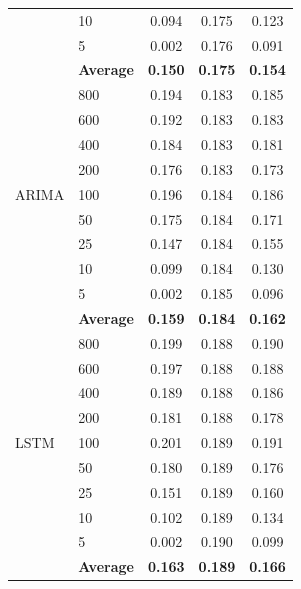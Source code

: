 \documentclass[11pt,a4paper]{article}
\begin{document}
\begin{table}[H]
\begin{tabular}{llccc}
 & 10  & 0.094 & 0.175 & 0.123 \\
 & 5   & 0.002 & 0.176 & 0.091 \\
 & \textbf{Average} & \textbf{0.150} & \textbf{0.175} & \textbf{0.154} \\
\midrule
\multirow{9}{*}{ARIMA}
 & 800 & 0.194 & 0.183 & 0.185 \\
 & 600 & 0.192 & 0.183 & 0.183 \\
 & 400 & 0.184 & 0.183 & 0.181 \\
 & 200 & 0.176 & 0.183 & 0.173 \\
 & 100 & 0.196 & 0.184 & 0.186 \\
 & 50  & 0.175 & 0.184 & 0.171 \\
 & 25  & 0.147 & 0.184 & 0.155 \\
 & 10  & 0.099 & 0.184 & 0.130 \\
 & 5   & 0.002 & 0.185 & 0.096 \\
 & \textbf{Average} & \textbf{0.159} & \textbf{0.184} & \textbf{0.162} \\
\midrule
\multirow{9}{*}{LSTM}
 & 800 & 0.199 & 0.188 & 0.190 \\
 & 600 & 0.197 & 0.188 & 0.188 \\
 & 400 & 0.189 & 0.188 & 0.186 \\
 & 200 & 0.181 & 0.188 & 0.178 \\
 & 100 & 0.201 & 0.189 & 0.191 \\
 & 50  & 0.180 & 0.189 & 0.176 \\
 & 25  & 0.151 & 0.189 & 0.160 \\
 & 10  & 0.102 & 0.189 & 0.134 \\
 & 5   & 0.002 & 0.190 & 0.099 \\
 & \textbf{Average} & \textbf{0.163} & \textbf{0.189} & \textbf{0.166} \\
\bottomrule
\end{tabular}
\end{table}
\end{document}
